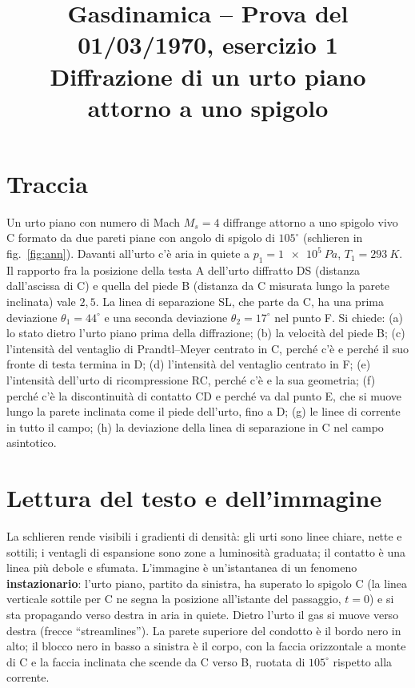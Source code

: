 \documentclass[11pt,a4paper]{article}
\title{Gasdinamica -- Prova del 01/03/1970, esercizio 1\\[2pt]
\large Diffrazione di un urto piano attorno a uno spigolo}
\author{}
\date{}
\begin{document}
\maketitle

\section*{Traccia}
Un urto piano con numero di Mach $M_s=4$ diffrange attorno a uno spigolo vivo C formato da due pareti piane con
angolo di spigolo di $105^\circ$ (schlieren in fig.~\ref{fig:ann}). Davanti all'urto c'è aria in quiete a
$p_1=\SI{1e5}{Pa}$, $T_1=\SI{293}{K}$. Il rapporto fra la posizione della testa A dell'urto diffratto DS (distanza
dall'ascissa di C) e quella del piede B (distanza da C misurata lungo la parete inclinata) vale $2{,}5$. La linea di
separazione SL, che parte da C, ha una prima deviazione $\theta_1=44^\circ$ e una seconda deviazione
$\theta_2=17^\circ$ nel punto F. Si chiede: (a) lo stato dietro l'urto piano prima della diffrazione; (b) la velocità
del piede B; (c) l'intensità del ventaglio di Prandtl--Meyer centrato in C, perché c'è e perché il suo fronte di testa
termina in D; (d) l'intensità del ventaglio centrato in F; (e) l'intensità dell'urto di ricompressione RC, perché c'è
e la sua geometria; (f) perché c'è la discontinuità di contatto CD e perché va dal punto E, che si muove lungo la
parete inclinata come il piede dell'urto, fino a D; (g) le linee di corrente in tutto il campo; (h) la deviazione
della linea di separazione in C nel campo asintotico.

\section{Lettura del testo e dell'immagine}
La schlieren rende visibili i gradienti di densità: gli urti sono linee chiare, nette e sottili; i ventagli di
espansione sono zone a luminosità graduata; il contatto è una linea più debole e sfumata. L'immagine è un'istantanea
di un fenomeno \textbf{instazionario}: l'urto piano, partito da sinistra, ha superato lo spigolo C (la linea verticale
sottile per C ne segna la posizione all'istante del passaggio, $t=0$) e si sta propagando verso destra in aria in
quiete. Dietro l'urto il gas si muove verso destra (frecce ``streamlines''). La parete superiore del condotto è il
bordo nero in alto; il blocco nero in basso a sinistra è il corpo, con la faccia orizzontale a monte di C e la faccia
inclinata che scende da C verso B, ruotata di $105^\circ$ rispetto alla corrente.
\end{document}
